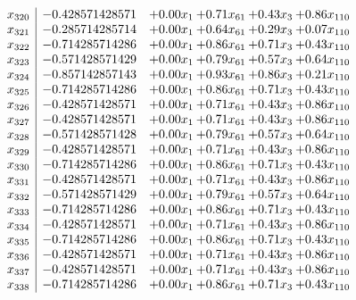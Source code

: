 \documentclass[8pt]{article}
\begin{document}
\[\begin{array}{c| c c@{\hskip 2pt} c@{\hskip 2pt} c@{\hskip 2pt} c@{\hskip 2pt} }
 x_{320}   &  -0.428571428571 & +  0.00 x_{1} & +  0.71 x_{61} & +  0.43 x_{3} & +  0.86 x_{110}\\
 x_{321}   &  -0.285714285714 & +  0.00 x_{1} & +  0.64 x_{61} & +  0.29 x_{3} & +  0.07 x_{110}\\
 x_{322}   &  -0.714285714286 & +  0.00 x_{1} & +  0.86 x_{61} & +  0.71 x_{3} & +  0.43 x_{110}\\
 x_{323}   &  -0.571428571429 & +  0.00 x_{1} & +  0.79 x_{61} & +  0.57 x_{3} & +  0.64 x_{110}\\
 x_{324}   &  -0.857142857143 & +  0.00 x_{1} & +  0.93 x_{61} & +  0.86 x_{3} & +  0.21 x_{110}\\
 x_{325}   &  -0.714285714286 & +  0.00 x_{1} & +  0.86 x_{61} & +  0.71 x_{3} & +  0.43 x_{110}\\
 x_{326}   &  -0.428571428571 & +  0.00 x_{1} & +  0.71 x_{61} & +  0.43 x_{3} & +  0.86 x_{110}\\
 x_{327}   &  -0.428571428571 & +  0.00 x_{1} & +  0.71 x_{61} & +  0.43 x_{3} & +  0.86 x_{110}\\
 x_{328}   &  -0.571428571428 & +  0.00 x_{1} & +  0.79 x_{61} & +  0.57 x_{3} & +  0.64 x_{110}\\
 x_{329}   &  -0.428571428571 & +  0.00 x_{1} & +  0.71 x_{61} & +  0.43 x_{3} & +  0.86 x_{110}\\
 x_{330}   &  -0.714285714286 & +  0.00 x_{1} & +  0.86 x_{61} & +  0.71 x_{3} & +  0.43 x_{110}\\
 x_{331}   &  -0.428571428571 & +  0.00 x_{1} & +  0.71 x_{61} & +  0.43 x_{3} & +  0.86 x_{110}\\
 x_{332}   &  -0.571428571429 & +  0.00 x_{1} & +  0.79 x_{61} & +  0.57 x_{3} & +  0.64 x_{110}\\
 x_{333}   &  -0.714285714286 & +  0.00 x_{1} & +  0.86 x_{61} & +  0.71 x_{3} & +  0.43 x_{110}\\
 x_{334}   &  -0.428571428571 & +  0.00 x_{1} & +  0.71 x_{61} & +  0.43 x_{3} & +  0.86 x_{110}\\
 x_{335}   &  -0.714285714286 & +  0.00 x_{1} & +  0.86 x_{61} & +  0.71 x_{3} & +  0.43 x_{110}\\
 x_{336}   &  -0.428571428571 & +  0.00 x_{1} & +  0.71 x_{61} & +  0.43 x_{3} & +  0.86 x_{110}\\
 x_{337}   &  -0.428571428571 & +  0.00 x_{1} & +  0.71 x_{61} & +  0.43 x_{3} & +  0.86 x_{110}\\
 x_{338}   &  -0.714285714286 & +  0.00 x_{1} & +  0.86 x_{61} & +  0.71 x_{3} & +  0.43 x_{110}\\

\end{array}\]
\end{document}

